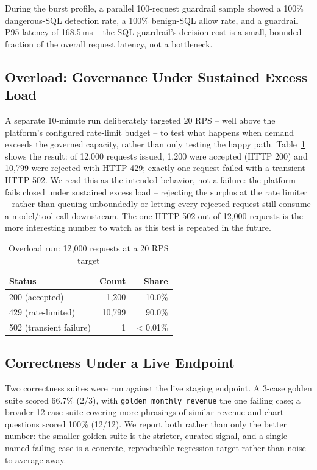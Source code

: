 \documentclass[conference]{IEEEtran}
\begin{document}
During the burst profile, a parallel 100-request guardrail sample showed a
100\% dangerous-SQL detection rate, a 100\% benign-SQL allow rate, and a
guardrail P95 latency of 168.5\,ms -- the SQL guardrail's decision cost is
a small, bounded fraction of the overall request latency, not a bottleneck.

\subsection{Overload: Governance Under Sustained Excess Load}
A separate 10-minute run deliberately targeted 20 RPS -- well above the
platform's configured rate-limit budget -- to test what happens when
demand exceeds the governed capacity, rather than only testing the happy
path. Table~\ref{tab:staging-overload} shows the result: of 12{,}000
requests issued, 1{,}200 were accepted (HTTP 200) and 10{,}799 were
rejected with HTTP 429; exactly one request failed with a transient HTTP
502. We read this as the intended behavior, not a failure: the platform
fails closed under sustained excess load -- rejecting the surplus at the
rate limiter -- rather than queuing unboundedly or letting every rejected
request still consume a model/tool call downstream. The one HTTP 502 out
of 12{,}000 requests is the more interesting number to watch as this test
is repeated in the future.

\begin{table}[t]
\centering
\caption{Overload run: 12{,}000 requests at a 20 RPS target}
\label{tab:staging-overload}
\footnotesize
\begin{tabular}{@{}lrr@{}}
\toprule
\textbf{Status} & \textbf{Count} & \textbf{Share} \\
\midrule
200 (accepted) & 1{,}200 & 10.0\% \\
429 (rate-limited) & 10{,}799 & 90.0\% \\
502 (transient failure) & 1 & $<$0.01\% \\
\bottomrule
\end{tabular}
\end{table}

\subsection{Correctness Under a Live Endpoint}
Two correctness suites were run against the live staging endpoint. A
3-case golden suite scored 66.7\% (2/3), with \texttt{golden\_monthly\_revenue}
the one failing case; a broader 12-case suite covering more phrasings of
similar revenue and chart questions scored 100\% (12/12). We report both
rather than only the better number: the smaller golden suite is the
stricter, curated signal, and a single named failing case is a concrete,
reproducible regression target rather than noise to average away.
\end{document}
